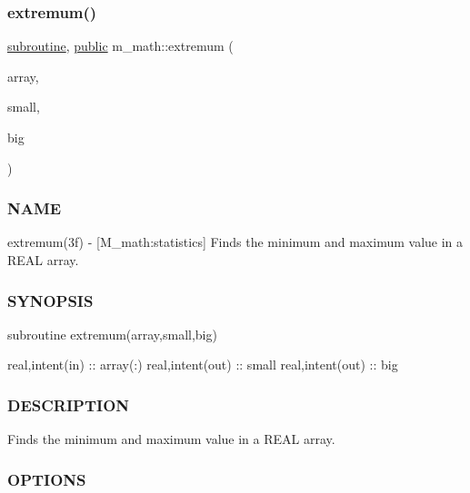 \subsubsection{\texorpdfstring{extremum()}{extremum()}}
{\footnotesize\ttfamily \hyperlink{M__stopwatch_83_8txt_acfbcff50169d691ff02d4a123ed70482}{subroutine}, \hyperlink{M__stopwatch_83_8txt_a2f74811300c361e53b430611a7d1769f}{public} m\+\_\+math\+::extremum (\begin{DoxyParamCaption}\item[{\hyperlink{read__watch_83_8txt_abdb62bde002f38ef75f810d3a905a823}{real}, dimension(\+:), intent(\hyperlink{M__journal_83_8txt_afce72651d1eed785a2132bee863b2f38}{in})}]{array,  }\item[{\hyperlink{read__watch_83_8txt_abdb62bde002f38ef75f810d3a905a823}{real}, intent(out), \hyperlink{option__stopwatch_83_8txt_aa4ece75e7acf58a4843f70fe18c3ade5}{optional}}]{small,  }\item[{\hyperlink{read__watch_83_8txt_abdb62bde002f38ef75f810d3a905a823}{real}, intent(out), \hyperlink{option__stopwatch_83_8txt_aa4ece75e7acf58a4843f70fe18c3ade5}{optional}}]{big }\end{DoxyParamCaption})}



\subsubsection*{N\+A\+ME}

extremum(3f) -\/ \mbox{[}M\+\_\+math\+:statistics\mbox{]} Finds the minimum and maximum value in a R\+E\+AL array. \subsubsection*{S\+Y\+N\+O\+P\+S\+IS}

subroutine extremum(array,small,big)

real,intent(in) \+:\+: array(\+:) real,intent(out) \+:\+: small real,intent(out) \+:\+: big

\subsubsection*{D\+E\+S\+C\+R\+I\+P\+T\+I\+ON}

Finds the minimum and maximum value in a R\+E\+AL array.

\subsubsection*{O\+P\+T\+I\+O\+NS}

